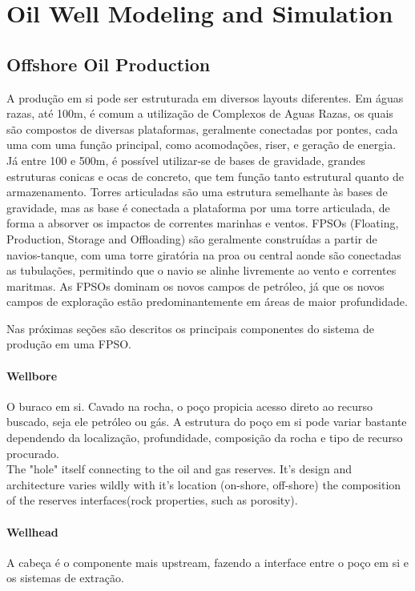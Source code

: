

\chapter{Oil Well Modeling and Simulation} \label{chap:2}


\section{Offshore Oil Production}

A produção em si pode ser estruturada em diversos layouts diferentes. Em águas razas, até 100m, é comum a utilização de Complexos de Aguas Razas, os quais são compostos de diversas plataformas, geralmente conectadas por pontes, cada uma com uma função principal, como acomodações, riser, e geração de energia.
Já entre 100 e 500m, é possível utilizar-se de bases de gravidade, grandes estruturas conicas e ocas de concreto, que tem função tanto estrutural quanto de armazenamento. Torres articuladas são uma estrutura semelhante às bases de gravidade, mas as base é conectada a plataforma por uma torre articulada, de forma a absorver os impactos de correntes marinhas e ventos.
FPSOs (Floating, Production, Storage and Offloading) são geralmente construídas a partir de navios-tanque, com uma torre giratória na proa ou central aonde são conectadas as tubulações, permitindo que o navio se alinhe livremente ao vento e correntes maritmas. As FPSOs dominam os novos campos de petróleo, já que os novos campos de exploração estão predominantemente em áreas de maior profundidade.

Nas próximas seções são descritos os principais componentes do sistema de produção em uma FPSO.

\subsubsection{Wellbore}

O buraco em si. Cavado na rocha, o poço propicia acesso direto ao recurso buscado, seja ele petróleo ou gás. A estrutura do poço em si pode variar bastante dependendo da localização, profundidade, composição da rocha e tipo de recurso procurado.
 \\
The "hole" itself connecting to the oil and gas reserves. It's design and architecture varies wildly with it's location (on-shore, off-shore) the composition of the reserves interfaces(rock properties, such as porosity).

\subsubsection{Wellhead}
A cabeça é o componente mais upstream, fazendo a interface entre o poço em si e os sistemas de extração.


